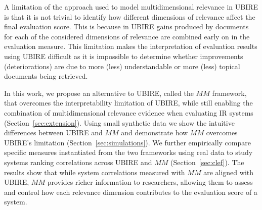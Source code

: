 A limitation of the approach used to model multidimensional relevance in UBIRE is that it is not trivial to identify how different dimensions of relevance affect the final evaluation score. This is because in UBIRE gains produced by documents for each of the considered dimensions of relevance are combined early on in the evaluation measure. This limitation makes the interpretation of evaluation results using UBIRE difficult as it is impossible to determine whether improvements (deteriorations) are due to more (less) understandable or more (less) topical documents being retrieved. 

In this work, we propose an alternative to UBIRE, called the $MM$ framework, that overcomes the interpretability limitation of UBIRE, while still enabling the combination of multidimensional relevance evidence when evaluating IR systems (Section~\ref{sec:extension}). Using small synthetic data we show the intuitive differences between UBIRE and $MM$ and demonstrate how $MM$ overcomes UBIRE's limitation (Section~\ref{sec:simulations}). We further empirically compare specific measures instantiated from the two frameworks using real data to study systems ranking correlations across UBIRE and $MM$ (Section~\ref{sec:clef}). The results show that while system correlations measured with $MM$ are aligned with UBIRE, $MM$ provides richer information to researchers, allowing them to assess and control how each relevance dimension contributes
to the evaluation score of a system.



